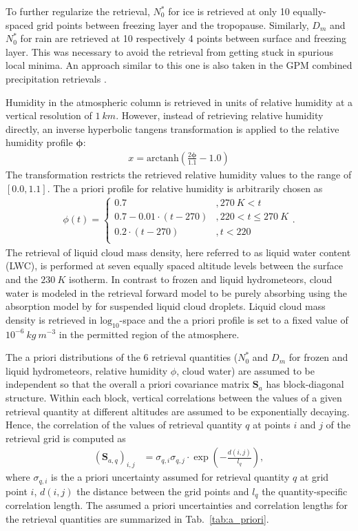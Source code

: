 \documentclass[journal abbreviation, manuscript]{copernicus}
\begin{document}
To further regularize the retrieval, $N_0^*$ for ice is retrieved at only 10
equally-spaced grid points between freezing layer and the tropopause. Similarly,
$D_m$ and $N_0^*$ for rain are retrieved at 10 respectively 4 points between surface and
freezing layer. This was necessary to avoid the retrieval from getting stuck in
spurious local minima. An approach similar to this one is also taken in the GPM
combined precipitation retrievals \citep{grecu16}.

Humidity in the atmospheric column is retrieved in units of relative humidity at
a vertical resolution of $1\ \unit{km}$. However, instead of retrieving relative
humidity directly, an inverse hyperbolic tangens transformation is applied to
the relative humidity profile $\mathbf{\phi}$:
%
\begin{align}
x = \text{arctanh}(\frac{2 \mathbf{\phi}}{1.1} - 1.0)
\end{align}
%
The transformation restricts the retrieved relative humidity values to
the range of $[0.0, 1.1]$. The a priori profile for relative humidity
is arbitrarily chosen as
%
\begin{align}
\phi(t) = \begin{cases}
 0.7 &, 270\ \unit{K} < t \\
 0.7 - 0.01 \cdot (t - 270) & ,220 < t \leq  270\ \unit{K} \\
 0.2 \cdot (t - 270) & ,t < 220 \\
 \end{cases}.
\end{align}
%
The retrieval of liquid cloud mass density, here referred to as liquid water
content (LWC), is performed at seven equally spaced altitude levels between the
surface and the $230\ \unit{K}$ isotherm. In contrast to frozen and liquid
hydrometeors, cloud water is modeled in the retrieval forward model to be purely
absorbing using the absorption model by \cite{liebe93} for suspended liquid
cloud droplets. Liquid cloud mass density is retrieved in
$\text{log}_{10}$-space and the a priori profile is set to a fixed value of
$10^{-6}\ \unit{kg\ m^{-3}}$ in the permitted region of the atmosphere.

The a priori distributions of the 6 retrieval quantities ($N_0^*$ and $D_m$ for
frozen and liquid hydrometeors, relative humidity $\phi$, cloud water) are
assumed to be independent so that the overall a priori covariance matrix
$\mathbf{S}_a$ has block-diagonal structure. Within each block, vertical
correlations between the values of a given retrieval quantity at different
altitudes are assumed to be exponentially decaying. Hence, the correlation of
the values of retrieval quantity $q$ at points $i$ and $j$ of the retrieval grid
is computed as
%
\begin{align}
\left ( \mathbf{S}_{a,q} \right )_{i, j} &= \sigma_{q,i} \sigma_{q,j}
 \cdot \exp  \left ( -\frac{d(i, j)}{l_q} \right ),
\end{align}
%
where $\sigma_{q, i}$ is the a priori uncertainty assumed for retrieval
quantity $q$ at grid point $i$, $d(i, j)$ the distance between the grid
points and $l_q$ the quantity-specific correlation length. The assumed
a priori uncertainties and correlation lengths for the retrieval quantities
are summarized in Tab.~\ref{tab:a_priori}.
\end{document}
